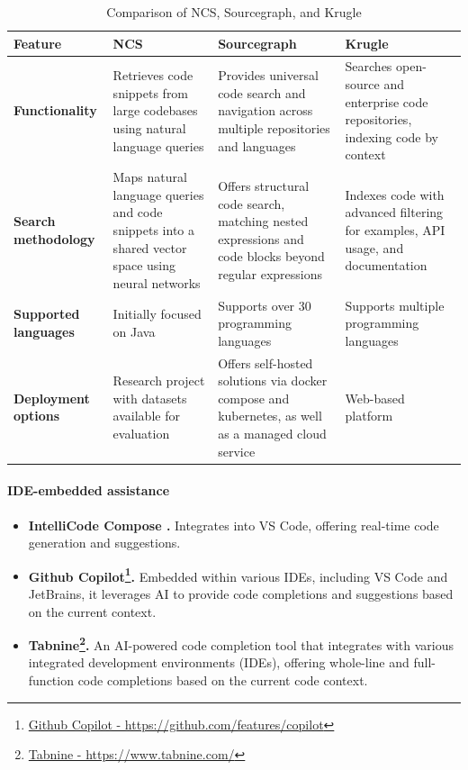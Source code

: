     \begin{table}[h!]
    \centering
    \begin{tabular}{p{3cm}p{4cm}p{4cm}p{4cm}}
    \hline
    \textbf{Feature} & \textbf{NCS} & \textbf{Sourcegraph} & \textbf{Krugle} \\ \hline
    
    \textbf{Functionality}
    & Retrieves code snippets from large codebases using natural language queries
    & Provides universal code search and navigation across multiple repositories and languages
    & Searches open-source and enterprise code repositories, indexing code by context \\ \hline
    
    \textbf{Search methodology}
    & Maps natural language queries and code snippets into a shared vector space using neural networks
    & Offers structural code search, matching nested expressions and code blocks beyond regular expressions
    & Indexes code with advanced filtering for examples, API usage, and documentation \\ \hline
    
    \textbf{Supported languages}
    & Initially focused on Java
    & Supports over 30 programming languages
    & Supports multiple programming languages \\ \hline
    
    \textbf{Deployment options}
    & Research project with datasets available for evaluation
    & Offers self-hosted solutions via docker compose and kubernetes, as well as a managed cloud service
    & Web-based platform \\ \hline
    
    \end{tabular}
    \caption{Comparison of NCS, Sourcegraph, and Krugle}
    \end{table}

\paragraph*{IDE-embedded assistance}
    \begin{itemize}
        \item \textbf{IntelliCode Compose \cite{svyatkovskiy2020}.} Integrates into VS Code, offering real-time code generation and suggestions.
        \item \textbf{Github Copilot\footnote{\href{https://github.com/features/copilot}{Github Copilot - https://github.com/features/copilot}}.} Embedded within various IDEs, including VS Code and JetBrains, it leverages AI to provide code completions and suggestions based on the current context.
        \item \textbf{Tabnine\footnote{\href{https://www.tabnine.com/}{Tabnine - https://www.tabnine.com/}}.} An AI-powered code completion tool that integrates with various integrated development environments
        (IDEs), offering whole-line and full-function code completions based on the current code context.
    \end{itemize}

